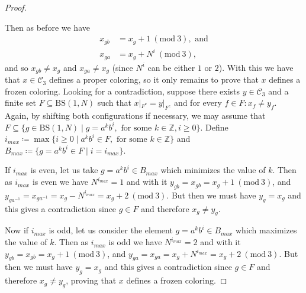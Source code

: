 \documentclass[letterpaper,10pt]{article}
\theoremstyle{plain}
\newcommand{\BS}[1][N]{\mathrm{BS}(1,#1)}
\begin{document}
\begin{proof}
\begin{figure}[H]
	\end{figure}	
	
	Then as before we have
	\begin{align*}
	x_{gb}&=x_g+1 \ (\mathrm{mod} \ 3), \text{ and} \\
	x_{ga}&=x_g+N^i \ (\mathrm{mod} \ 3),
	\end{align*}
	and so $x_{gb}\neq x_g$ and $x_{ga}\neq x_g$ (since $N^i$ can be either $1$ or $2$). With this we have that $x\in \mathcal{C}_3$ defines a proper coloring, so it only remains to prove that $x$ defines a frozen coloring. Looking for a contradiction, suppose there exists $y\in \mathcal{C}_3$ and a finite set $F\subseteq \BS$ such that $x|_{F^c}=y|_{F^c}$ and for every $f\in F: x_f\neq y_f$. Again, by shifting both configurations if necessary, we may assume that $F\subseteq \{g\in \BS\mid g=a^kb^i, \text{ for some }k\in \mathbb{Z}, i\ge 0\}$. Define $i_{max}\coloneqq \max\{ i\ge 0\mid a^kb^i\in F, \text{ for some }k\in \mathbb{Z}\}$ and $B_{max}\coloneqq\{g=a^kb^i\in F\mid i=i_{max}\}$.
	
	If $i_{max}$ is even, let us take $g=a^kb^i\in B_{max}$ which minimizes the value of $k$. Then as $i_{max}$ is even we have $N^{i_{max}}=1$ and with it $y_{gb}=x_{gb}=x_g+1  \ (\mathrm{mod} \ 3)$, and $y_{ga^{-1}}=x_{ga^{-1}}=x_g-N^{i_{max}} = x_g+2  \ (\mathrm{mod} \ 3)$. But then we must have $y_g=x_g$ and this gives a contradiction since $g\in F$ and therefore $x_g\neq y_g$.
	
	Now if $i_{max}$ is odd, let us consider the element $g=a^kb^i\in B_{max}$ which maximizes the value of $k$. Then as $i_{max}$ is odd we have $N^{i_{max}}=2$ and with it $y_{gb}=x_{gb}=x_g+1  \ (\mathrm{mod} \ 3)$, and $y_{ga}=x_{ga}=x_g+N^{i_{max}} = x_g+2  \ (\mathrm{mod} \ 3)$. But then we must have $y_g=x_g$ and this gives a contradiction since $g\in F$ and therefore $x_g\neq y_g$, proving that $x$ defines a frozen coloring.
	

\end{proof}
\end{document}
